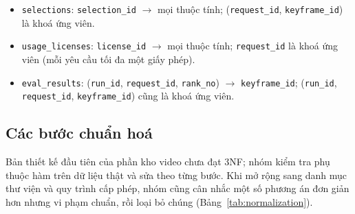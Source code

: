 \begin{itemize}
    \texttt{origin}, \texttt{requested\_by}, \texttt{purpose}, \texttt{status},
    \texttt{created\_at}).
    \item \texttt{selections}: \texttt{selection\_id} $\rightarrow$ mọi thuộc tính;
    (\texttt{request\_id}, \texttt{keyframe\_id}) là khoá ứng viên.
    \item \texttt{usage\_licenses}: \texttt{license\_id} $\rightarrow$ mọi thuộc tính;
    \texttt{request\_id} là khoá ứng viên (mỗi yêu cầu tối đa một giấy phép).
    \item \texttt{eval\_results}: (\texttt{run\_id}, \texttt{request\_id}, \texttt{rank\_no})
    $\rightarrow$ \texttt{keyframe\_id}; (\texttt{run\_id}, \texttt{request\_id},
    \texttt{keyframe\_id}) cũng là khoá ứng viên.
\end{itemize}

\subsection{Các bước chuẩn hoá}

Bản thiết kế đầu tiên của phần kho video chưa đạt 3NF; nhóm kiểm tra phụ thuộc hàm trên dữ
liệu thật và sửa theo từng bước. Khi mở rộng sang danh mục thư viện và quy trình cấp phép,
nhóm cũng cân nhắc một số phương án đơn giản hơn nhưng vi phạm chuẩn, rồi loại bỏ chúng
(Bảng~\ref{tab:normalization}).

